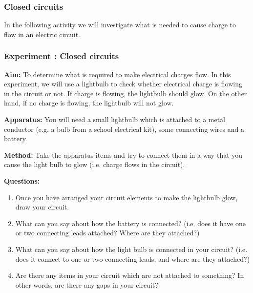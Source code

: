             \subsubsection{ Closed circuits}
            \nopagebreak
        \label{m38771*id62637}In the following activity we will investigate what is needed to cause charge to flow in an electric circuit.\par 
\label{m38771*secfhsst!!!underscore!!!id97}
            \subsubsection{ Experiment : Closed circuits }
            \nopagebreak
            \label{m38771*id62648}\noindent{}\textbf{Aim:}
To determine what is required to make electrical charges flow.
In this experiment, we will use a lightbulb to check whether electrical charge is flowing in the circuit or not. If charge is flowing, the lightbulb should glow. On the other hand, if no charge is flowing, the lightbulb will not glow.\par 
        \label{m38771*id62665}\noindent{}\textbf{Apparatus:}
        You will need a small lightbulb which is attached to a metal conductor (e.g. a bulb from a school electrical kit), some connecting wires and a battery.\par 
        \label{m38771*id62679}\noindent{}\textbf{Method:}
        Take the apparatus items and try to connect them in a way that you cause the light bulb to glow (i.e. charge flows in the circuit).\par 
        \label{m38771*id62694}\noindent{}\textbf{Questions:}
        \label{m38771*id62702}\begin{enumerate}[noitemsep, label=\textbf{\arabic*}. ] 
            \label{m38771*uid6}\item Once you have arranged your circuit elements to make the lightbulb glow, draw your circuit.
\label{m38771*uid7}\item What can you say about how the battery is connected? (i.e. does it have one or two connecting leads attached? Where are they attached?)
\label{m38771*uid8}\item What can you say about how the light bulb is connected in your circuit? (i.e. does it connect to one or two connecting leads, and where are they attached?)
\label{m38771*uid9}\item Are there any items in your circuit which are not attached to something? In other words, are there any gaps in your circuit?
\end{enumerate}
